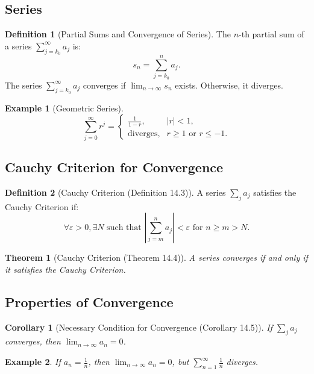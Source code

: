 \documentclass[9pt]{article}
\theoremstyle{definition}
\newtheorem{definition}{Definition}
\theoremstyle{plain}
\newtheorem{theorem}{Theorem}
\newtheorem{example}{Example}
\newtheorem{corollary}{Corollary}
\begin{document}
\subsection*{Series}
\begin{definition}[Partial Sums and Convergence of Series]
The \( n \)-th partial sum of a series \( \sum_{j=k_0}^\infty a_j \) is:
\[
s_n = \sum_{j=k_0}^n a_j.
\]
The series \( \sum_{j=k_0}^\infty a_j \) converges if \( \lim_{n \to \infty} s_n \) exists. Otherwise, it diverges.
\end{definition}

\begin{example}[Geometric Series]
\[
\sum_{j=0}^\infty r^j =
\begin{cases}
\frac{1}{1-r}, & |r| < 1, \\
\text{diverges}, & r \geq 1 \text{ or } r \leq -1.
\end{cases}
\]
\end{example}

\subsection*{Cauchy Criterion for Convergence}
\begin{definition}[Cauchy Criterion (Definition 14.3)]
A series \( \sum_j a_j \) satisfies the Cauchy Criterion if:
\[
\forall \varepsilon > 0, \exists N \text{ such that } \left|\sum_{j=m}^n a_j\right| < \varepsilon \text{ for } n \geq m > N.
\]
\end{definition}

\begin{theorem}[Cauchy Criterion (Theorem 14.4)]
A series converges if and only if it satisfies the Cauchy Criterion.
\end{theorem}

\subsection*{Properties of Convergence}
\begin{corollary}[Necessary Condition for Convergence (Corollary 14.5)]
If \( \sum_j a_j \) converges, then \( \lim_{n \to \infty} a_n = 0 \).
\end{corollary}

\begin{example}
If \( a_n = \frac{1}{n} \), then \( \lim_{n \to \infty} a_n = 0 \), but \( \sum_{n=1}^\infty \frac{1}{n} \) diverges.
\end{example}
\end{document}

